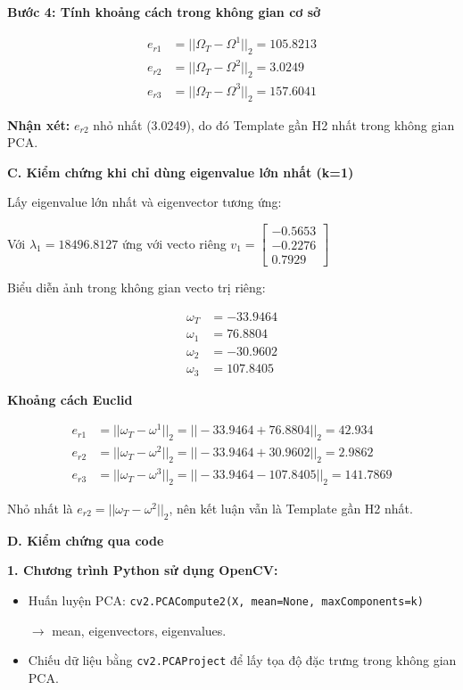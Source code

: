 \textbf{Bước 4: Tính khoảng cách trong không gian cơ sở}

\begin{align*}
e_{r1} &= ||\Omega_T - \Omega^1||_2 = 105.8213 \\
e_{r2} &= ||\Omega_T - \Omega^2||_2 = 3.0249 \\
e_{r3} &= ||\Omega_T - \Omega^3||_2 = 157.6041
\end{align*}

\textbf{Nhận xét:} $e_{r2}$ nhỏ nhất (3.0249), do đó Template gần H2 nhất trong không gian PCA.

\textbf{C. Kiểm chứng khi chỉ dùng eigenvalue lớn nhất (k=1)}

Lấy eigenvalue lớn nhất và eigenvector tương ứng:

Với $\lambda_1 = 18496.8127$ ứng với vecto riêng $v_1 = \begin{bmatrix}
-0.5653 \\
-0.2276 \\
0.7929
\end{bmatrix}$

Biểu diễn ảnh trong không gian vecto trị riêng:

\begin{align*}
\omega_T &= -33.9464 \\
\omega_1 &= 76.8804 \\
\omega_2 &= -30.9602 \\
\omega_3 &= 107.8405
\end{align*}

\textbf{Khoảng cách Euclid}

\begin{align*}
e_{r1} &= ||\omega_T - \omega^1||_2 = ||-33.9464 + 76.8804||_2 = 42.934 \\
e_{r2} &= ||\omega_T - \omega^2||_2 = ||-33.9464 + 30.9602||_2 = 2.9862 \\
e_{r3} &= ||\omega_T - \omega^3||_2 = ||-33.9464 - 107.8405||_2 = 141.7869
\end{align*}

Nhỏ nhất là $e_{r2} = ||\omega_T - \omega^2||_2$, nên kết luận vẫn là Template gần H2 nhất.

\textbf{D. Kiểm chứng qua code}

\textbf{1. Chương trình Python sử dụng OpenCV:}

\begin{itemize}
    \item Huấn luyện PCA: \texttt{cv2.PCACompute2(X, mean=None, maxComponents=k)}
    
    $\rightarrow$ mean, eigenvectors, eigenvalues.
    
    \item Chiếu dữ liệu bằng \texttt{cv2.PCAProject} để lấy tọa độ đặc trưng trong không gian PCA.
\end{itemize}

